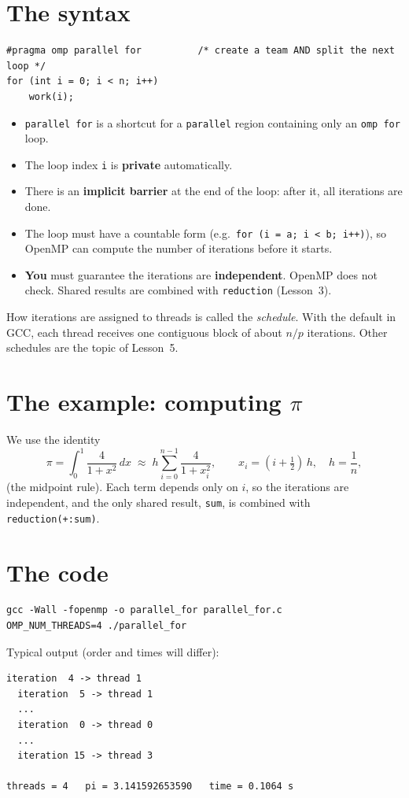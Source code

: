 \documentclass[11pt,a4paper]{article}
\begin{document}
\section{The syntax}
\begin{lstlisting}
#pragma omp parallel for          /* create a team AND split the next loop */
for (int i = 0; i < n; i++)
    work(i);
\end{lstlisting}
\begin{itemize}
  \item \texttt{parallel for} is a shortcut for a \texttt{parallel} region containing only
        an \texttt{omp for} loop.
  \item The loop index \texttt{i} is \textbf{private} automatically.
  \item There is an \textbf{implicit barrier} at the end of the loop: after it, all
        iterations are done.
  \item The loop must have a countable form (e.g.\ \texttt{for (i = a; i < b; i++)}),
        so OpenMP can compute the number of iterations before it starts.
  \item \textbf{You} must guarantee the iterations are \textbf{independent}. OpenMP does
        not check. Shared results are combined with \texttt{reduction} (Lesson~3).
\end{itemize}
How iterations are assigned to threads is called the \emph{schedule}. With the default
in GCC, each thread receives one contiguous block of about $n/p$ iterations. Other
schedules are the topic of Lesson~5.

\section{The example: computing $\pi$}
We use the identity
\[
  \pi = \int_0^1 \frac{4}{1+x^2}\,dx \;\approx\; h\sum_{i=0}^{n-1}\frac{4}{1+x_i^2},
  \qquad x_i = (i+\tfrac12)\,h,\quad h=\frac1n,
\]
(the midpoint rule). Each term depends only on $i$, so the iterations are independent,
and the only shared result, \texttt{sum}, is combined with \texttt{reduction(+:sum)}.

\section{The code}


\begin{lstlisting}[style=sh]
gcc -Wall -fopenmp -o parallel_for parallel_for.c
OMP_NUM_THREADS=4 ./parallel_for
\end{lstlisting}
Typical output (order and times will differ):
\begin{lstlisting}[style=sh]
  iteration  4 -> thread 1
  iteration  5 -> thread 1
  ...
  iteration  0 -> thread 0
  ...
  iteration 15 -> thread 3

threads = 4   pi = 3.141592653590   time = 0.1064 s
\end{lstlisting}
\end{document}
